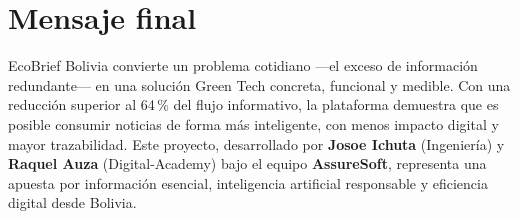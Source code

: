 \section*{Mensaje final}

EcoBrief Bolivia convierte un problema cotidiano ---el exceso de informaci\'on redundante--- en una soluci\'on Green Tech concreta, funcional y medible. Con una reducci\'on superior al 64\,\% del flujo informativo, la plataforma demuestra que es posible consumir noticias de forma m\'as inteligente, con menos impacto digital y mayor trazabilidad. Este proyecto, desarrollado por \textbf{Josoe Ichuta} (Ingenier\'ia) y \textbf{Raquel Auza} (Digital-Academy) bajo el equipo \textbf{AssureSoft}, representa una apuesta por informaci\'on esencial, inteligencia artificial responsable y eficiencia digital desde Bolivia.

\begin{center}
\end{center}
